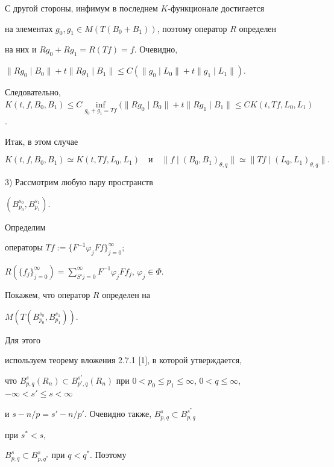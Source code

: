 С другой стороны, инфимум в последнем $K$-функционале достигается 


на элементах $g_0,g_1\in M(T(B_0+B_1))$, поэтому оператор $R$ определен 


на них и $Rg_0+Rg_1=R(Tf)=f$. Очевидно, 


$\|Rg_0\mid B_0\|+t\|Rg_1\mid B_1\|\le C(\|g_0\mid L_0\|+ 


t\|g_1\mid L_1\|)$. 


Следовательно, $K(t,f,B_0,B_1)\le 


C\inf\limits_{g_0+g_1=Tf}(\|Rg_0\mid B_0\|+t\|Rg_1\mid B_1\|\le 


C K(t,Tf,L_0,L_1)$. 


Итак, в этом случае 


\begin{equation} 


K(t,f,B_0,B_1)\simeq K(t,Tf,L_0,L_1)\quad 


\text{и} 


\quad \|f\mid(B_0,B_1)_{\theta,q}\|\simeq 


\|Tf\mid(L_0,L_1)_{\theta,q}\|. 


\end{equation} 


 


3) Рассмотрим любую пару пространств 


$(B^{s_0}_{p_0},B^{s_1}_{p_1})$. 


Определим 


операторы $Tf:=\{F^{-1}\varphi_j Ff\}^\infty_{j=0}$; 


$R(\{f_j\}^\infty_{j=0})=\sum\limits^\infty_{S'j=0} 


F^{-1}\varphi_j Ff_j$, $\varphi_j\in\Phi$. 


Покажем, что оператор $R$ определен на 


$M(T(B^{s_0}_{p_0},B^{s_1}_{p_1}))$. 


Для этого 


используем теорему вложения 2.7.1 [1], в которой утверждается, 


что $B^s_{p,q}(R_n)\subset B^{s'}_{p',q}(R_n)$ при $0<p_0\le 


p_1\le\infty$, $0<q\le\infty$, $-\infty<s'\le s<\infty$ 


и $s-n/p=s'-n/p'$. Очевидно также, $B^s_{p,q}\subset B^{s^*}_{p,q}$ 


при $s^*<s$, 


$B^s_{p,q}\subset B^s_{p,q^*}$ при $q<q^*$. Поэтому 


